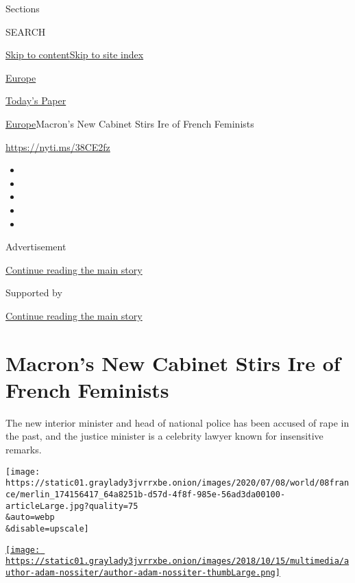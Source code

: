 Sections

SEARCH

\protect\hyperlink{site-content}{Skip to
content}\protect\hyperlink{site-index}{Skip to site index}

\href{https://www.nytimes3xbfgragh.onion/section/world/europe}{Europe}

\href{https://myaccount.nytimes3xbfgragh.onion/auth/login?response_type=cookie\&client_id=vi}{}

\href{https://www.nytimes3xbfgragh.onion/section/todayspaper}{Today's
Paper}

\href{/section/world/europe}{Europe}\textbar{}Macron's New Cabinet Stirs
Ire of French Feminists

\url{https://nyti.ms/38CE2fz}

\begin{itemize}
\item
\item
\item
\item
\item
\end{itemize}

Advertisement

\protect\hyperlink{after-top}{Continue reading the main story}

Supported by

\protect\hyperlink{after-sponsor}{Continue reading the main story}

\hypertarget{macrons-new-cabinet-stirs-ire-of-french-feminists}{%
\section{Macron's New Cabinet Stirs Ire of French
Feminists}\label{macrons-new-cabinet-stirs-ire-of-french-feminists}}

The new interior minister and head of national police has been accused
of rape in the past, and the justice minister is a celebrity lawyer
known for insensitive remarks.

\texttt{[image: https://static01.graylady3jvrrxbe.onion/images/2020/07/08/world/08france/merlin\_174156417\_64a8251b-d57d-4f8f-985e-56ad3da00100-articleLarge.jpg?quality=75\\\&auto=webp\\\&disable=upscale]}

\href{https://www.nytimes3xbfgragh.onion/by/adam-nossiter}{\texttt{[image: https://static01.graylady3jvrrxbe.onion/images/2018/10/15/multimedia/author-adam-nossiter/author-adam-nossiter-thumbLarge.png]}}

